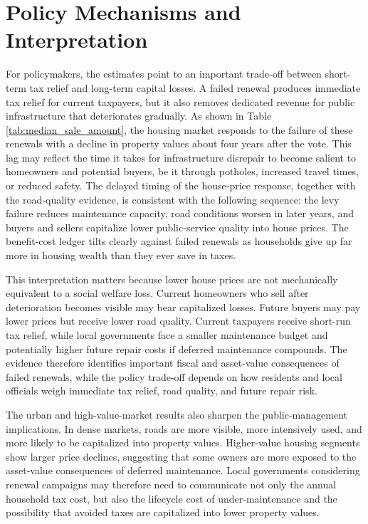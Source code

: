 

\section{Policy Mechanisms and Interpretation} \label{sec:mech}

For policymakers, the estimates point to an important trade-off between short-term tax relief and long-term capital losses. A failed renewal produces immediate tax relief for current taxpayers, but it also removes dedicated revenue for public infrastructure that deteriorates gradually. As shown in Table \ref{tab:median_sale_amount}, the housing market responds to the failure of these renewals with a decline in property values about four years after the vote. This lag may reflect the time it takes for infrastructure disrepair to become salient to homeowners and potential buyers, be it through potholes, increased travel times, or reduced safety. The delayed timing of the house-price response, together with the road-quality evidence, is consistent with the following sequence: the levy failure reduces maintenance capacity, road conditions worsen in later years, and buyers and sellers capitalize lower public-service quality into house prices. The benefit-cost ledger tilts clearly against failed renewals as households give up far more in housing wealth than they ever save in taxes.

This interpretation matters because lower house prices are not mechanically equivalent to a social welfare loss. Current homeowners who sell after deterioration becomes visible may bear capitalized losses. Future buyers may pay lower prices but receive lower road quality. Current taxpayers receive short-run tax relief, while local governments face a smaller maintenance budget and potentially higher future repair costs if deferred maintenance compounds. The evidence therefore identifies important fiscal and asset-value consequences of failed renewals, while the policy trade-off depends on how residents and local officials weigh immediate tax relief, road quality, and future repair risk.

The urban and high-value-market results also sharpen the public-management implications. In dense markets, roads are more visible, more intensively used, and more likely to be capitalized into property values. Higher-value housing segments show larger price declines, suggesting that some owners are more exposed to the asset-value consequences of deferred maintenance. Local governments considering renewal campaigns may therefore need to communicate not only the annual household tax cost, but also the lifecycle cost of under-maintenance and the possibility that avoided taxes are capitalized into lower property values.

